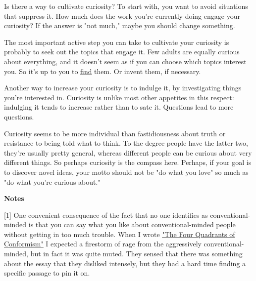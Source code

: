 Is there a way to
                  cultivate curiosity? To start with, you want to avoid
                  situations that suppress it. How much does the work you're
                  currently doing engage your curiosity? If the answer is "not
                  much," maybe you should change something.

The most
                  important active step you can take to cultivate your curiosity
                  is probably to seek out the topics that engage it. Few adults
                  are equally curious about everything, and it doesn't seem as
                  if you can choose which topics interest you. So it's up to you
                  to \href{http://www.paulgraham.com/genius.html}{\underline{find}} them. Or invent them,
                  if necessary.

Another way to increase your
                  curiosity is to indulge it, by investigating things you're
                  interested in. Curiosity is unlike most other appetites in
                  this respect: indulging it tends to increase rather than to
                  sate it. Questions lead to more questions.

Curiosity
                  seems to be more individual than fastidiousness about truth or
                  resistance to being told what to think. To the degree people
                  have the latter two, they're usually pretty general, whereas
                  different people can be curious about very different things.
                  So perhaps curiosity is the compass here. Perhaps, if your
                  goal is to discover novel ideas, your motto should not be "do
                  what you love" so much as "do what you're curious about."







\textbf{Notes}

[1] One convenient consequence of the fact that no one
                  identifies as conventional-minded is that you can say what you
                  like about conventional-minded people without getting in too
                  much trouble. When I wrote
                  \href{http://www.paulgraham.com/conformism.html}{\underline{"The Four Quadrants of Conformism"}}
                  I expected a firestorm of rage from the aggressively
                  conventional-minded, but in fact it was quite muted. They
                  sensed that there was something about the essay that they
                  disliked intensely, but they had a hard time finding a
                  specific passage to pin it on.


